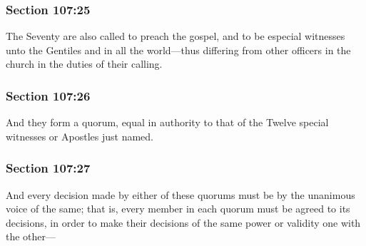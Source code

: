 	\subsubsection{Section 107:25} %
		\label{DC107-25}

		The Seventy are also called to preach the gospel, and to be especial witnesses unto the Gentiles and in all the world---thus differing from other officers in the church in the duties of their calling.


	\subsubsection{Section 107:26} %
		\label{DC107-26}

		And they form a quorum, equal in authority to that of the Twelve special witnesses or Apostles just named.


	\subsubsection{Section 107:27} %
		\label{DC107-27}

		And every decision made by either of these quorums must be by the unanimous voice of the same; that is, every member in each quorum must be agreed to its decisions, in order to make their decisions of the same power or validity one with the other---



